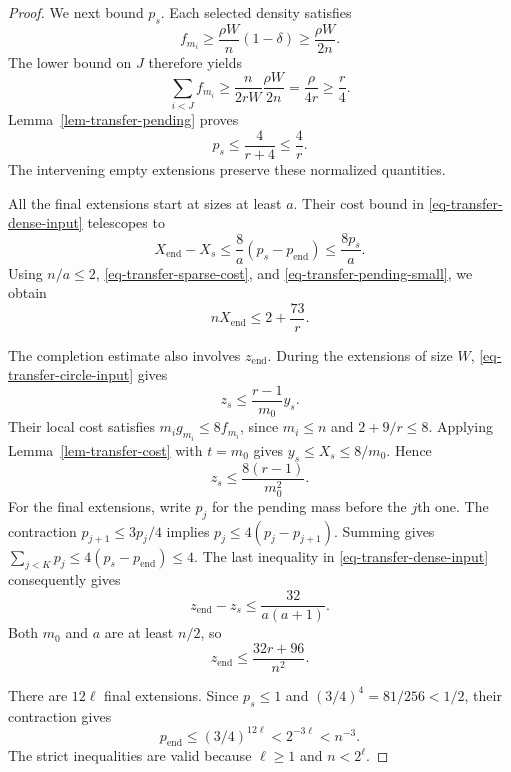 \begin{proof}
We next bound $p_s$. Each selected density satisfies
\[
 f_{m_i}\ge\frac{\rho W}{n}(1-\delta)
 \ge\frac{\rho W}{2n}.
\]
The lower bound on $J$ therefore yields
\[
 \sum_{i<J} f_{m_i}
 \ge\frac{n}{2rW}\frac{\rho W}{2n}
 =\frac{\rho}{4r}\ge\frac r4.
\]
Lemma~\ref{lem-transfer-pending} proves
\begin{equation}
 p_s\le\frac4{r+4}\le\frac4r.
 \label{eq-transfer-pending-small}
\end{equation}
The intervening empty extensions preserve these normalized quantities.

All the final extensions start at sizes at least $a$. Their cost bound
in \eqref{eq-transfer-dense-input} telescopes to
\[
 X_{\mathrm{end}}-X_s
 \le\frac8a(p_s-p_{\mathrm{end}})
 \le\frac{8p_s}{a}.
\]
Using $n/a\le2$, \eqref{eq-transfer-sparse-cost}, and
\eqref{eq-transfer-pending-small}, we obtain
\begin{equation}
 nX_{\mathrm{end}}\le2+\frac{73}{r}.
 \label{eq-transfer-total-cost}
\end{equation}

The completion estimate also involves $z_{\mathrm{end}}$. During the
extensions of size $W$, \eqref{eq-transfer-circle-input} gives
\[
 z_s\le\frac{r-1}{m_0}y_s.
\]
Their local cost satisfies $m_i g_{m_i}\le8f_{m_i}$, since
$m_i\le n$ and $2+9/r\le8$. Applying
Lemma~\ref{lem-transfer-cost} with $t=m_0$ gives
$y_s\le X_s\le8/m_0$. Hence
\[
 z_s\le\frac{8(r-1)}{m_0^2}.
\]
For the final extensions, write $p_j$ for the pending mass before the
$j$th one. The contraction $p_{j+1}\le3p_j/4$ implies
$p_j\le4(p_j-p_{j+1})$. Summing gives
$\sum_{j<K}p_j\le4(p_s-p_{\mathrm{end}})\le4$.
The last inequality in \eqref{eq-transfer-dense-input} consequently gives
\[
 z_{\mathrm{end}}-z_s
 \le\frac{32}{a(a+1)}.
\]
Both $m_0$ and $a$ are at least $n/2$, so
\begin{equation}
 z_{\mathrm{end}}\le\frac{32r+96}{n^2}.
 \label{eq-transfer-final-circles}
\end{equation}

There are $12\ell$ final extensions. Since $p_s\le1$ and
$(3/4)^4=81/256<1/2$, their contraction gives
\begin{equation}
 p_{\mathrm{end}}
 \le(3/4)^{12\ell}<2^{-3\ell}<n^{-3}.
 \label{eq-transfer-final-pending}
\end{equation}
The strict inequalities are valid because $\ell\ge1$ and $n<2^\ell$.


\end{proof}
